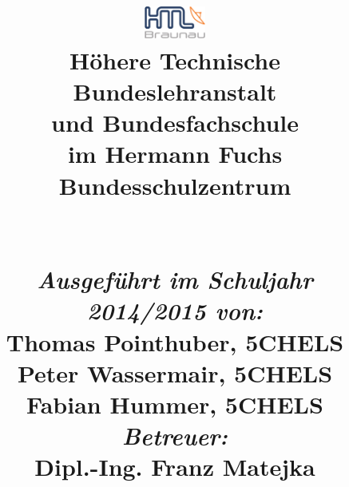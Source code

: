 
\begin{titlepage}
\title{
%
{\includegraphics[width=0.15\textwidth]{./includes/htl_c_cmyk_rein.pdf}}
%
\\{\normalsize \textbf{Höhere Technische Bundeslehranstalt}}
\\[-0.4em] {\normalsize \textbf{und Bundesfachschule}}
\\[-0.4em] {\normalsize im Hermann Fuchs Bundesschulzentrum}
%
\\\vspace{3cm}{ \textbf{\htlArbeitsthema}}
%
\\\vspace{0.5cm} {\Large \textsc{\htlArbeit}}
%
\\\vspace{5cm}
%
{\normalsize \emph{Ausgeführt im Schuljahr 2014/2015 von:}}
\\{\normalsize Thomas Pointhuber, 5CHELS}
\\[-0.4em] {\normalsize Peter Wassermair, 5CHELS}
\\[-0.4em] {\normalsize Fabian Hummer, 5CHELS}
\\[1.0em] {\normalsize \emph{Betreuer:}}
\\{\normalsize Dipl.-Ing. Franz Matejka}
}		
%
\maketitle
\end{titlepage}
\restoregeometry
\pagebreak
